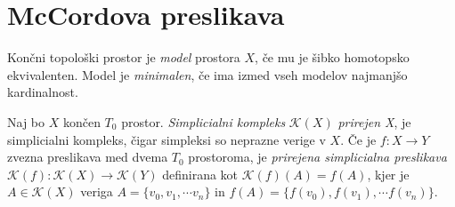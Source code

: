 \documentclass[mat1]{fmfdelo}
\begin{document}

   

\section{McCordova preslikava}\label{sec:minimal}

\begin{definicija}
    Končni topološki prostor je \textit{model} prostora $X$, če mu je šibko homotopsko ekvivalenten. Model je \textit{minimalen}, če ima izmed vseh modelov najmanjšo kardinalnost.
\end{definicija}


\begin{definicija}
    Naj bo $X$ končen $T_0$ prostor. \textit{Simplicialni kompleks} $\mathcal{K}(X)$ \textit{prirejen X}, je simplicialni kompleks, čigar simpleksi so neprazne verige v $X$. Če je $f\colon  X\rightarrow Y$ zvezna preslikava med dvema $T_0$ prostoroma, je \textit{prirejena simplicialna preslikava} $\mathcal{K}(f)\colon \mathcal{K}(X) \rightarrow \mathcal{K}(Y)$ definirana kot $\mathcal{K}(f)(A) = f(A)$, kjer je  $A\in \mathcal{K}(X)$ veriga $A=\{v_0,v_1,\cdots v_n\}$ in $f(A)=\{f(v_0),f(v_1),\cdots f(v_n)\}$.
\end{definicija}
\end{document}
